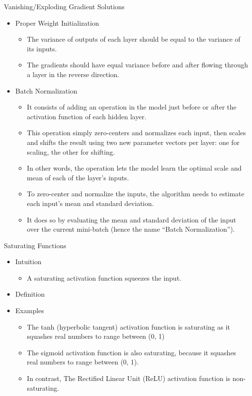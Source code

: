 \begin{frame}{Vanishing/Exploding Gradient Solutions}
    \begin{itemize}
        \item Proper Weight Initialization 
        \begin{itemize}
            \item The variance of outputs of each layer should be equal to the variance of its inputs.
            \item The gradients should have equal variance before and after flowing through a layer in the reverse direction.
        \end{itemize}
        \item Batch Normalization
        \begin{itemize}
            \item It consists of adding an operation in the model just before or after the activation function of each hidden layer.
            \item This operation simply zero-centers and normalizes each input, then scales and shifts the result using two new parameter vectors per layer: one for scaling, the other for shifting.
            \item In other words, the operation lets the model learn the optimal scale and mean of each of the layer’s inputs.
            \item To zero-center and normalize the inputs, the algorithm needs to estimate each input’s mean and standard deviation.
            \item It does so by evaluating the mean and standard deviation of the input over the current mini-batch (hence the name “Batch Normalization”).
        \end{itemize}
    \end{itemize}
\end{frame}

\begin{frame}{Saturating Functions}
    \begin{itemize}
        \item Intuition
        \begin{itemize}
            \item A saturating activation function squeezes the input.
        \end{itemize}
        \item Definition
        
        \item Examples
        \begin{itemize}
            \item The tanh (hyperbolic tangent) activation function is saturating as it squashes real numbers to range between (0, 1)
            \item The sigmoid activation function is also saturating, because it squashes real numbers to range between (0, 1).
            \item In contrast, The Rectified Linear Unit (ReLU) activation function is non-saturating.
        \end{itemize}
    \end{itemize}
    
\end{frame}